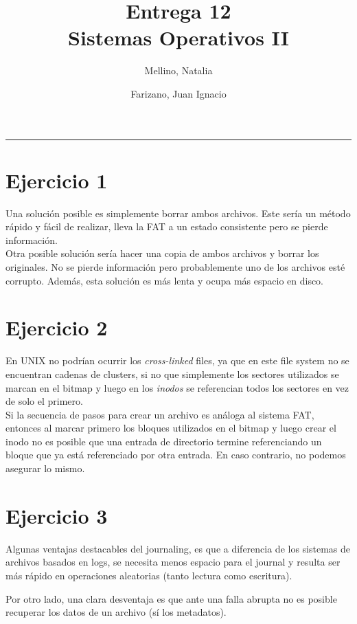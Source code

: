 \documentclass[11pt]{article}
\title{
    Entrega 12 \\
    \large Sistemas Operativos II}
\author{Mellino, Natalia \and Farizano, Juan Ignacio}
\date{}
\begin{document}
\maketitle

\noindent\rule{\textwidth}{1pt}

\section*{Ejercicio 1}
Una solución posible es simplemente borrar ambos archivos. Este sería
un método rápido y fácil de realizar, lleva la FAT a un estado consistente
pero se pierde información. \\
Otra posible solución sería hacer una copia de ambos archivos y borrar
los originales. No se pierde información pero probablemente uno de los archivos
esté corrupto. Además, esta solución es más lenta y ocupa más espacio en disco.

\section*{Ejercicio 2}
En UNIX no podrían ocurrir los \emph{cross-linked} files, ya que en este file system
no se encuentran cadenas de clusters, si no que simplemente los sectores utilizados
se marcan en el bitmap y luego en los \emph{inodos} se referencian todos los sectores
en vez de solo el primero. \\

Si la secuencia de pasos para crear un archivo es análoga al sistema FAT, entonces
al marcar primero los bloques utilizados en el bitmap y luego crear el inodo no es
posible que una entrada de directorio termine referenciando un bloque que ya está 
referenciado por otra entrada. En caso contrario, no podemos asegurar lo mismo.

\section*{Ejercicio 3}
Algunas ventajas destacables del journaling, es que a diferencia de los sistemas de 
archivos basados en logs, se necesita menos espacio para el journal y resulta ser más 
rápido en operaciones aleatorias (tanto lectura como escritura).

Por otro lado, una clara desventaja es que ante una falla abrupta no es posible
recuperar los datos de un archivo (sí los metadatos).
\end{document}
